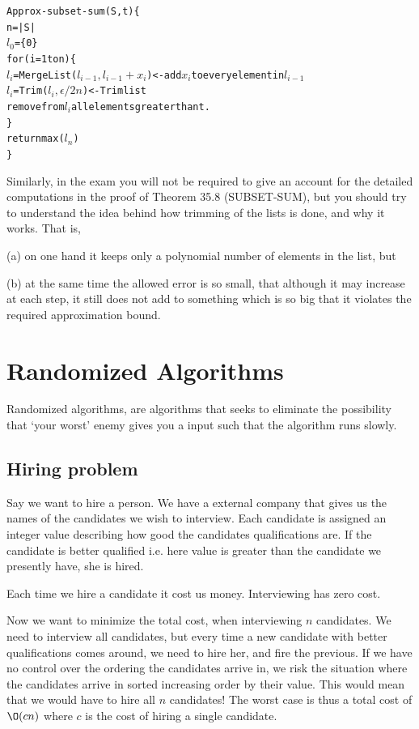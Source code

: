 \documentclass[10pt]{article}
\begin{document}
\begin{alltt}
Approx-subset-sum(S,t)\{
  n = |S|
  \(l_0\) = \{0\}
  for(i=1 to n)\{
    \(l_i\) = MergeList(\(l_{i-1},l_{i-1}+x_i\))  <- add \(x_i\) to every element in \(l_{i-1}\)
    \(l_i\) = Trim(\(l_{i},\epsilon/2n\)) <- Trim list
    remove from \(l_i\) all elements greater than t.
  \}
  return max(\(l_n\))
\}  
\end{alltt}

Similarly, in the exam you will not be required to give an account for the detailed computations in the proof of Theorem 35.8 (SUBSET-SUM), but you should try to understand the idea behind how trimming of the lists is done, and why it works. That is,

(a) on one hand it keeps only a polynomial number of elements in the list, but

(b) at the same time the allowed error is so small, that although it may increase at each step, it still does not add to something which is so big that it violates the required approximation bound.


\clearpage \newpage
\section{Randomized Algorithms} %
\label{sec:randomized_algoritms}
Randomized algorithms, are algorithms that seeks to eliminate the possibility that `your worst' enemy gives you a input such that the algorithm runs slowly.

\subsection{Hiring problem} %
\label{sub:hiring_problem}
Say we want to hire a person. We have a external company that gives us the names of the candidates we wish to interview. Each candidate is assigned an integer value describing how good the candidates qualifications are. If the candidate is better qualified i.e. here value is greater than the candidate we presently have, she is hired.

Each time we hire a candidate it cost us money. Interviewing has zero cost.

Now we want to minimize the total cost, when interviewing $n$ candidates. We need to interview all candidates, but every time a new candidate with better qualifications comes around, we need to hire her, and fire the previous. If we have no control over the ordering the candidates arrive in, we risk the situation where the candidates arrive in sorted increasing order by their value. This would mean that we would have to hire all $n$ candidates! The worst case is thus a total cost of $\O(cn)$ where $c$ is the cost of hiring a single candidate.
\end{document}
